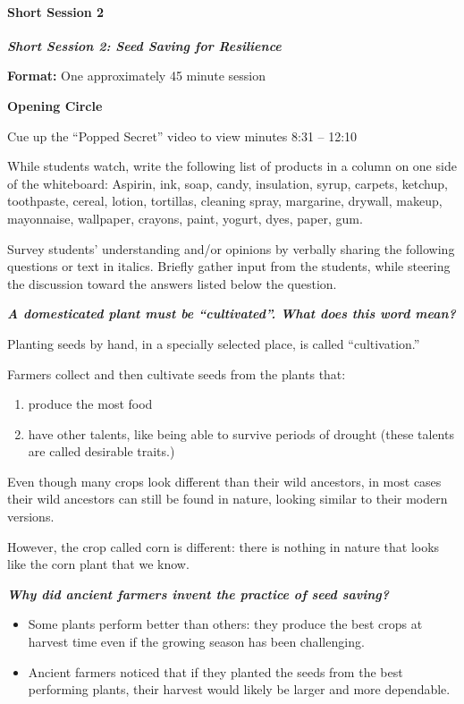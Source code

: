 \documentclass[12pt,]{article}
\providecommand{\tightlist}{%
  \setlength{\itemsep}{0pt}\setlength{\parskip}{0pt}}
\let\oldparagraph\paragraph
\renewcommand{\paragraph}[1]{\oldparagraph{#1}\mbox{}}
\begin{document}
\hypertarget{short-session-2-3}{%
\paragraph{Short Session 2}\label{short-session-2-3}}

\textbf{\emph{Short Session 2: Seed Saving for Resilience}}

\textbf{Format:} One approximately 45 minute session

\textbf{Opening Circle}

Cue up the ``Popped Secret'' video to view minutes 8:31 -- 12:10

While students watch, write the following list of products in a column on one side of the whiteboard: Aspirin, ink, soap, candy, insulation, syrup, carpets, ketchup, toothpaste, cereal, lotion, tortillas, cleaning spray, margarine, drywall, makeup, mayonnaise, wallpaper, crayons, paint, yogurt, dyes, paper, gum.

Survey students' understanding and/or opinions by verbally sharing the following questions or text in italics. Briefly gather input from the students, while steering the discussion toward the answers listed below the question.

\textbf{\emph{A domesticated plant must be ``cultivated''. What does this word mean?}}

Planting seeds by hand, in a specially selected place, is called ``cultivation.''

Farmers collect and then cultivate seeds from the plants that:

\begin{enumerate}
\def\labelenumi{\arabic{enumi}.}
\tightlist
\item
  produce the most food
\item
  have other talents, like being able to survive periods of drought (these talents are called desirable traits.)
\end{enumerate}

Even though many crops look different than their wild ancestors, in most cases their wild ancestors can still be found in nature, looking similar to their modern versions.

However, the crop called corn is different: there is nothing in nature that looks like the corn plant that we know.

\textbf{\emph{Why did ancient farmers invent the practice of seed saving?} }

\begin{itemize}
\tightlist
\item
  Some plants perform better than others: they produce the best crops at harvest time even if the growing season has been challenging.
\item
  Ancient farmers noticed that if they planted the seeds from the best performing plants, their harvest would likely be larger and more dependable.
\end{itemize}
\end{document}
